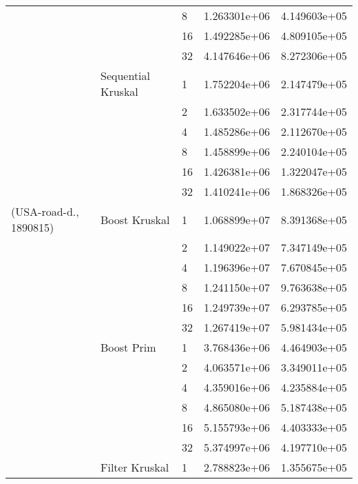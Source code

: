 \begin{tabular}{lllrr}
                       &                    & 8  &  1.263301e+06 &  4.149603e+05 \\
                       &                    & 16 &  1.492285e+06 &  4.809105e+05 \\
                       &                    & 32 &  4.147646e+06 &  8.272306e+05 \\
                       & Sequential Kruskal & 1  &  1.752204e+06 &  2.147479e+05 \\
                       &                    & 2  &  1.633502e+06 &  2.317744e+05 \\
                       &                    & 4  &  1.485286e+06 &  2.112670e+05 \\
                       &                    & 8  &  1.458899e+06 &  2.240104e+05 \\
                       &                    & 16 &  1.426381e+06 &  1.322047e+05 \\
                       &                    & 32 &  1.410241e+06 &  1.868326e+05 \\
(USA-road-d., 1890815) & Boost Kruskal & 1  &  1.068899e+07 &  8.391368e+05 \\
                       &                    & 2  &  1.149022e+07 &  7.347149e+05 \\
                       &                    & 4  &  1.196396e+07 &  7.670845e+05 \\
                       &                    & 8  &  1.241150e+07 &  9.763638e+05 \\
                       &                    & 16 &  1.249739e+07 &  6.293785e+05 \\
                       &                    & 32 &  1.267419e+07 &  5.981434e+05 \\
                       & Boost Prim & 1  &  3.768436e+06 &  4.464903e+05 \\
                       &                    & 2  &  4.063571e+06 &  3.349011e+05 \\
                       &                    & 4  &  4.359016e+06 &  4.235884e+05 \\
                       &                    & 8  &  4.865080e+06 &  5.187438e+05 \\
                       &                    & 16 &  5.155793e+06 &  4.403333e+05 \\
                       &                    & 32 &  5.374997e+06 &  4.197710e+05 \\
                       & Filter Kruskal & 1  &  2.788823e+06 &  1.355675e+05 \\

\end{tabular}
